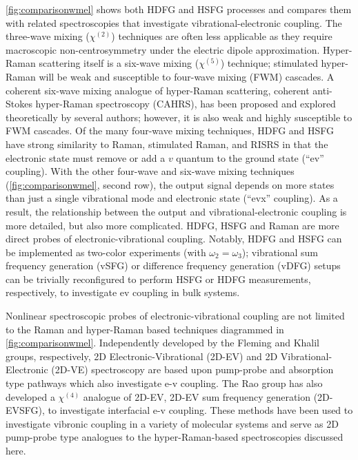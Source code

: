 \documentclass[aip, jcp, reprint, onecolumn, nofootinbib]{revtex4-2}
\begin{document}
\autoref{fig:comparisonwmel} shows both HDFG and HSFG processes and compares them with related spectroscopies that investigate vibrational-electronic coupling.
The three-wave mixing ($\chi^{(2)}$) techniques are often less applicable as they require macroscopic non-centrosymmetry under the electric dipole approximation.\cite{RN480}
Hyper-Raman scattering itself is a six-wave mixing ($\chi^{(5)}$) technique; stimulated hyper-Raman will be weak and susceptible to four-wave mixing (FWM) cascades.\cite{RN515, RN243, Cho2000_Cascade}
A coherent six-wave mixing analogue of hyper-Raman scattering, coherent anti-Stokes hyper-Raman spectroscopy (CAHRS), has been proposed and explored theoretically by several authors; however, it is also weak and highly susceptible to FWM cascades.\cite{Berger1978, Bjarnason1980, Cho1997, Cho1998}
Of the many four-wave mixing techniques, HDFG and HSFG have strong similarity to Raman, stimulated Raman, and RISRS in that the electronic state must remove or add a $v$ quantum to the ground state (``ev'' coupling).
With the other four-wave and six-wave mixing techniques (\autoref{fig:comparisonwmel}, second row), the output signal depends on more states than just a single vibrational mode and electronic state (``evx'' coupling).\cite{RN445, RN335} 
As a result, the relationship between the output and vibrational-electronic coupling is more detailed, but also more complicated.
HDFG, HSFG and Raman are more direct probes of electronic-vibrational coupling.
Notably, HDFG and HSFG can be implemented as two-color experiments (with $\omega_2=\omega_3$);\cite{Cho2001} vibrational sum frequency generation (vSFG) or difference frequency generation (vDFG) setups can be trivially reconfigured to perform HSFG or HDFG measurements, respectively, to investigate ev coupling in bulk systems.

Nonlinear spectroscopic probes of electronic-vibrational coupling are not limited to the Raman and hyper-Raman based techniques diagrammed in \autoref{fig:comparisonwmel}.
Independently developed by the Fleming and Khalil groups, respectively, 2D Electronic-Vibrational (2D-EV) and 2D Vibrational-Electronic (2D-VE) spectroscopy are based upon pump-probe and absorption type pathways which also investigate e-v coupling.\cite{Oliver2014, Courtney2015, Courtney2015_1}
The Rao group has also developed a $\chi^{(4)}$ analogue of 2D-EV, 2D-EV sum frequency generation (2D-EVSFG), to investigate interfacial e-v coupling. \cite{Deng2021}  
These methods have been used to investigate vibronic coupling in a variety of molecular systems and serve as 2D pump-probe type analogues to the hyper-Raman-based spectroscopies discussed here.\cite{Courtney2015, Gaynor2018, Arsenault2020, HuangFu2023}
\end{document}

